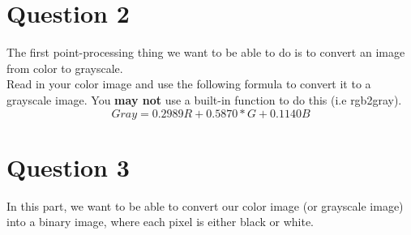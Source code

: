 \documentclass{article}
\begin{document}
\pagebreak
\section*{Question 2}
The first point-processing thing we want to be able to do is to convert an image from color to grayscale.\\

\noindent
Read in your color image and use the following formula to convert it to a grayscale image.  You \textbf{may not} use a built-in function to do this (i.e rgb2gray).\\

\begin{equation}
Gray=0.2989R+0.5870*G+0.1140B
\end{equation}
\begin{figure}[h!]
    \centering
\end{figure}

\pagebreak
\section*{Question 3}
In this part, we want to be able to convert our color image (or grayscale image) into a binary image, where each pixel is either black or white.\\
\end{document}
